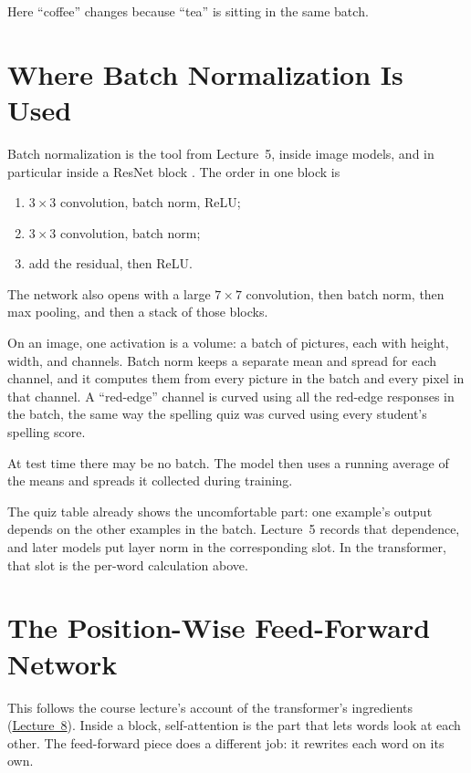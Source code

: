\documentclass[11pt]{article}
\begin{document}
Here ``coffee'' changes because ``tea'' is sitting in the same batch.

\section{Where Batch Normalization Is Used}

Batch normalization is the tool from Lecture~5, inside image models, and in
particular inside a ResNet block \cite{he2016deep}. The order in one block is
\begin{enumerate}[leftmargin=*, nosep]
  \item \(3\times 3\) convolution, batch norm, ReLU;
  \item \(3\times 3\) convolution, batch norm;
  \item add the residual, then ReLU.
\end{enumerate}
The network also opens with a large \(7\times 7\) convolution, then batch
norm, then max pooling, and then a stack of those blocks.

On an image, one activation is a volume: a batch of pictures, each with
height, width, and channels. Batch norm keeps a separate mean and spread
for each channel, and it computes them from every picture in the batch and
every pixel in that channel. A ``red-edge'' channel is curved using all the
red-edge responses in the batch, the same way the spelling quiz was curved
using every student's spelling score.

At test time there may be no batch. The model then uses a running average
of the means and spreads it collected during training.

The quiz table already shows the uncomfortable part: one example's output
depends on the other examples in the batch. Lecture~5 records that
dependence, and later models put layer norm in the corresponding slot. In
the transformer, that slot is the per-word calculation above.

\section{The Position-Wise Feed-Forward Network}
\label{sec:ffn}

This follows the course lecture's account of the transformer's ingredients
(\href{https://r-three.github.io/deep-learning-lecture-notes/lectures/08-transformers-part-1.html}{Lecture~8}).
Inside a block, self-attention is the part that lets words look at each
other. The feed-forward piece does a different job: it rewrites each word
on its own.
\end{document}
